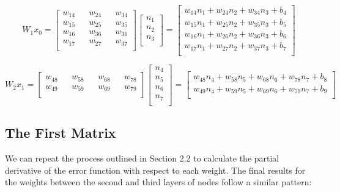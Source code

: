 \documentclass{article}
\begin{document}
\[W_1x_0 =
\begin{bmatrix}
    w_{14} && w_{24} && w_{34} \\
    w_{15} && w_{25} && w_{35} \\
    w_{16} && w_{36} && w_{36} \\
    w_{17} && w_{27} && w_{37} \\
\end{bmatrix}
\begin{bmatrix}
    n_1 \\
    n_2 \\
    n_3 \\
\end{bmatrix}
=
\begin{bmatrix}
    w_{14}n_1 + w_{24}n_2 + w_{34}n_3 + b_4 \\
    w_{15}n_1 + w_{25}n_2 + w_{35}n_3 + b_5 \\
    w_{16}n_1 + w_{26}n_2 + w_{36}n_3 + b_6 \\
    w_{17}n_1 + w_{27}n_2 + w_{37}n_3 + b_7 \\
\end{bmatrix}
\]

\[W_2x_1 =
\begin{bmatrix}
    w_{48} && w_{58} && w_{68} && w_{78}\\
    w_{49} && w_{59} && w_{69} && w_{79}\\
\end{bmatrix}
\begin{bmatrix}
    n_4 \\
    n_5 \\
    n_6 \\
    n_7 \\
\end{bmatrix}
=
\begin{bmatrix}
    w_{48}n_4 + w_{58}n_5 + w_{68}n_6 + w_{78}n_7 + b_8 \\
    w_{49}n_4 + w_{59}n_5 + w_{69}n_6 + w_{79}n_7 + b_9 \\
\end{bmatrix}
\]
\subsection{The First Matrix}

We can repeat the process outlined in Section 2.2 to calculate the partial derivative of the error function with respect to each weight. The final results for the weights between the second and third layers of nodes follow a similar pattern:
\end{document}
